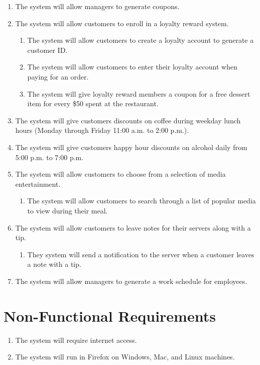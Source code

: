 \documentclass[12pt]{article}
\begin{document}
\begin{enumerate}
			\item The system will allow managers to generate coupons.

			\item The system will allow customers to enroll in a loyalty reward system.
				\begin{enumerate}
					\item The system will allow customers to create a loyalty account to generate a customer ID.
					\item The system will allow customers to enter their loyalty account when paying for an order.
					\item The system will give loyalty reward members a coupon for a free dessert item for every \$50 spent at the restaurant.
				\end{enumerate}

			\item The system will give customers discounts on coffee during weekday lunch hours (Monday through Friday 11:00 a.m. to 2:00 p.m.).
				
			\item The system will give customers happy hour discounts on alcohol daily from 5:00 p.m. to 7:00 p.m.

			\item The system will allow customers to choose from a selection of media entertainment.
				\begin{enumerate}
					\item The system will allow customers to search through a list of popular media to view during their meal.
				\end{enumerate}

			\item The system will allow customers to leave notes for their servers along with a tip.
				\begin{enumerate}
					\item They system will send a notification to the server when a customer leaves a note with a tip.
				\end{enumerate}

			\item The system will allow managers to generate a work schedule for employees.
		\end{enumerate}

	\section{Non-Functional Requirements}
		\begin{enumerate}
			\item The system will require internet access.
			\item The system will run in Firefox on Windows, Mac, and Linux machines.
		\end{enumerate}
\end{document}
